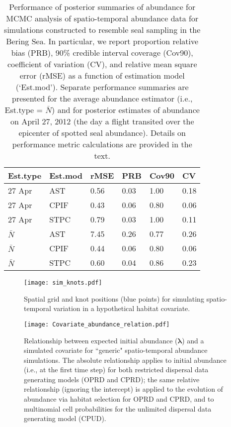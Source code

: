 \documentclass[12pt,fleqn]{article}
\begin{document}
\begin{flushleft}
\begin{table}[ht]
\caption{Performance of posterior summaries of abundance for MCMC analysis of spatio-temporal abundance data for simulations constructed to resemble seal sampling in the Bering Sea.  In particular, we report proportion relative bias (PRB), 90\% credible interval coverage (Cov90), coefficient of variation (CV), and relative mean square error (rMSE) as a function of estimation model (`Est.mod'). Separate performance summaries are presented for the average abundance estimator (i.e., Est.type = $\bar{N}$) and for posterior estimates of abundance on April 27, 2012 (the day a flight transited over the epicenter of spotted seal abundance).  Details on performance metric calculations are provided in the text.}
\label{tab:sim_Bering_results}
\begin{tabular}{llllll}
  \hline
Est.type & Est.mod & rMSE & PRB & Cov90 & CV  \\
  \hline
  27 Apr & AST & 0.56 & 0.03 & 1.00 & 0.18 \\
  27 Apr & CPIF & 0.43 & 0.06 & 0.80 & 0.06 \\
  27 Apr & STPC & 0.79 & 0.03 & 1.00 & 0.11 \\
  $\bar{N}$ & AST & 7.45 & 0.26 & 0.77 & 0.26  \\
  $\bar{N}$  & CPIF & 0.44 & 0.06 & 0.80 & 0.06 \\
  $\bar{N}$  & STPC & 0.60 & 0.04 & 0.86 & 0.23 \\
   \hline
\end{tabular}
\end{table}

\clearpage

\begin{figure*}
\begin{center}
\texttt{[image: sim\_knots.pdf]}
\caption{Spatial grid and knot positions (blue points) for simulating spatio-temporal variation in a hypothetical habitat covariate.} \label{fig:sim-hab}
\end{center}
\end{figure*}

\pagebreak

\begin{figure*}
\begin{center}
\texttt{[image: Covariate\_abundance\_relation.pdf]}
\caption{Relationship between expected initial abundance ($\boldsymbol{\lambda}$) and a simulated covariate for ``generic" spatio-temporal abundance simulations.  The absolute relationship applies to initial abundance (i.e., at the first time step) for both restricted dispersal data generating models (OPRD and CPRD); the same relative relationship (ignoring the intercept) is applied to the evolution of abundance via habitat selection for OPRD and CPRD, and to multinomial cell probabilities for the unlimited dispersal data generating model (CPUD).} \label{fig:cov-relation}
\end{center}
\end{figure*}


\end{flushleft}
\end{document}
